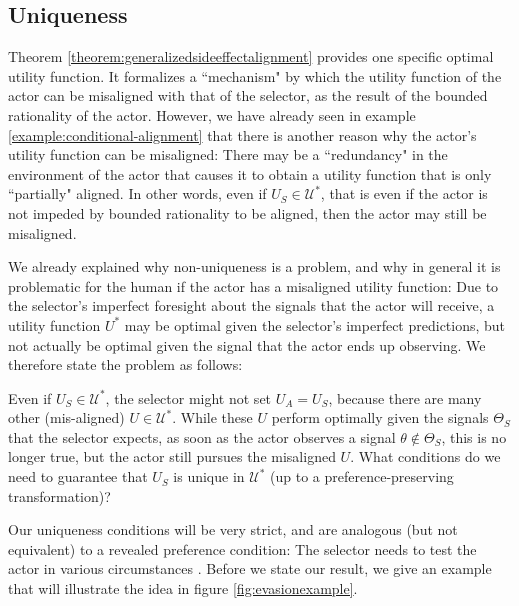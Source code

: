 




\subsection{Uniqueness }\label{sec:revealedpreference}

Theorem \ref{theorem:generalizedsideeffectalignment} provides one specific optimal utility function. It formalizes a ``mechanism" by which the utility function of the actor can be misaligned with that of the selector, as the result of the bounded rationality of the actor. However, we have already seen in example \ref{example:conditional-alignment} that there is another reason why the actor's utility function can be misaligned: There may be a ``redundancy" in the environment of the actor that causes it to obtain a utility function that is only ``partially" aligned. In other words, even if $U_S\in \mathcal U^*$, that is even if the actor is not impeded by bounded rationality to be aligned, then the actor may still be misaligned.

We already explained why non-uniqueness is a problem, and why in general it is problematic for the human if the actor has a misaligned utility function: Due to the selector's imperfect foresight about the signals that the actor will receive, a utility function $U^*$ may be optimal given the selector's imperfect predictions, but not actually be optimal given the signal that the actor ends up observing. We therefore state the problem as follows:

\begin{problem*}[Uniqueness]
	Even if $U_S\in \mathcal U^*$, the selector might not set $U_A=U_S$, because there are many other (mis-aligned) $U\in\mathcal U^*$. While these $U$ perform optimally given the signals $\Theta_S$ that the selector expects, as soon as the actor observes a signal $\theta\notin\Theta_S$, this is no longer true, but the actor still pursues the misaligned $U$. What conditions do we need to guarantee that $U_S$ is unique in $\mathcal U^*$ (up to a preference-preserving transformation)?
\end{problem*}

Our uniqueness conditions will be very strict, and are analogous (but not equivalent) to a revealed preference condition: The selector needs to test the actor in various circumstances . Before we state our result, we give an example that will illustrate the idea in figure \ref{fig:evasionexample}. 


